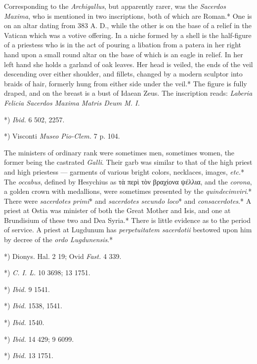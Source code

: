 \documentclass[a4paper, 11pt, oneside, polutonikogreek, english]{article}
\begin{document}
Corresponding to the \emph{Archigallus}, but apparently rarer, was the \emph{Sacerdos Maxima}, who is mentioned in two inscriptions, both of which are Roman.* One is on an altar dating from 383 A. D., while the other is on the base of a relief in the Vatican which was a votive offering. In a niche formed by a shell is the half-figure of a priestess who is in the act of pouring a libation from a patera in her right hand upon a small round altar on the base of which is an eagle in relief. In her left hand she holds a garland of oak leaves. Her head is veiled, the ends of the veil descending over either shoulder, and fillets, changed by a modern sculptor into braids of hair, formerly hung from either side under the veil.* The figure is fully draped, and on the breast is a bust of Idaean Zeus. The inscription reads: \emph{Laberia Felicia Sacerdos Maxima Matris Deum M. I.}

*) \emph{Ibid.} 6 502, 2257.

*) Visconti \emph{Museo Pio-Clem.} 7 p. 104.

The ministers of ordinary rank were sometimes men, sometimes women, the former being the castrated \emph{Galli}. Their garb was similar to that of the high priest and high priestess --- garments of various bright colors, necklaces, images, \emph{etc.}* The \emph{occabus}, defined by Hesychius as τὰ περὶ τὸν βραχίονα ψέλλια, and the \emph{corona}, a golden crown with medallions, were sometimes presented by the \emph{quindecimviri}.* There were \emph{sacerdotes primi}* and \emph{sacerdotes secundo loco}* and \emph{consacerdotes}.* A priest at Ostia was minister of both the Great Mother and Isis, and one at Brundisium of these two and Dea Syria.* There is little evidence as to the period of service. A priest at Lugdunum has \emph{perpetuitatem sacerdotii} bestowed upon him by decree of the \emph{ordo Lugdunensis}.*

*) Dionys. Hal. 2 19; Ovid \emph{Fast.} 4 339.

*) \emph{C. I. L.} 10 3698; 13 1751.

*) \emph{Ibid.} 9 1541.

*) \emph{Ibid.} 1538, 1541.

*) \emph{Ibid.} 1540.

*) \emph{Ibid.} 14 429; 9 6099.

*) \emph{Ibid.} 13 1751.
\end{document}
